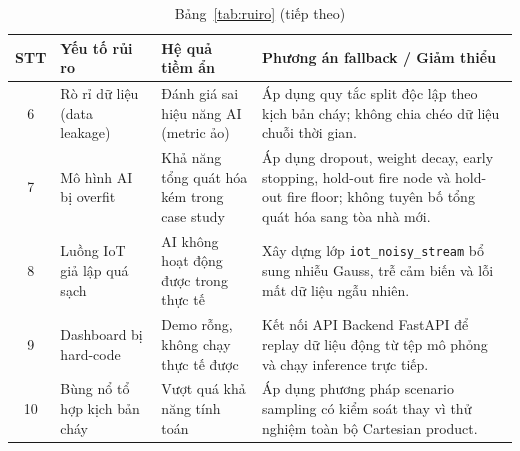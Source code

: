 \begin{table}[htbp]
\centering
\caption*{Bảng~\ref{tab:ruiro} (tiếp theo)}
\footnotesize
\begin{tabularx}{\textwidth}{
  c
  >{\raggedright\arraybackslash}p{}
  >{\raggedright\arraybackslash}p{}
  >{\raggedright\arraybackslash}X}
\toprule
\textbf{STT} & \textbf{Yếu tố rủi ro} & \textbf{Hệ quả tiềm ẩn} & \textbf{Phương án fallback / Giảm thiểu} \\
\midrule
6 & Rò rỉ dữ liệu (data leakage) & Đánh giá sai hiệu năng AI (metric ảo) & Áp dụng quy tắc split độc lập theo kịch bản cháy; không chia chéo dữ liệu chuỗi thời gian. \\
7 & Mô hình AI bị overfit & Khả năng tổng quát hóa kém trong case study & Áp dụng dropout, weight decay, early stopping, hold-out fire node và hold-out fire floor; không tuyên bố tổng quát hóa sang tòa nhà mới. \\
8 & Luồng IoT giả lập quá sạch & AI không hoạt động được trong thực tế & Xây dựng lớp \texttt{iot\_noisy\_stream} bổ sung nhiễu Gauss, trễ cảm biến và lỗi mất dữ liệu ngẫu nhiên. \\
9 & Dashboard bị hard-code & Demo rỗng, không chạy thực tế được & Kết nối API Backend FastAPI để replay dữ liệu động từ tệp mô phỏng và chạy inference trực tiếp. \\
10 & Bùng nổ tổ hợp kịch bản cháy & Vượt quá khả năng tính toán & Áp dụng phương pháp scenario sampling có kiểm soát thay vì thử nghiệm toàn bộ Cartesian product. \\
\bottomrule
\end{tabularx}
\end{table}
